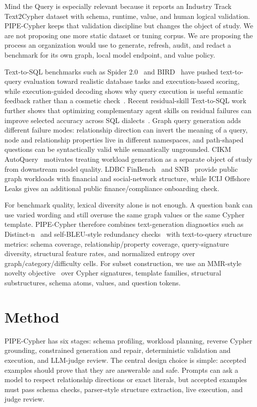 \documentclass[11pt]{article}
\begin{document}
Mind the Query is especially relevant because it reports an Industry Track Text2Cypher dataset with schema, runtime, value, and human logical validation. PIPE-Cypher keeps that validation discipline but changes the object of study. We are not proposing one more static dataset or tuning corpus. We are proposing the process an organization would use to generate, refresh, audit, and redact a benchmark for its own graph, local model endpoint, and value policy.

Text-to-SQL benchmarks such as Spider 2.0~\citep{spider22024} and BIRD~\citep{bird2023} have pushed text-to-query evaluation toward realistic database tasks and execution-based scoring, while execution-guided decoding shows why query execution is useful semantic feedback rather than a cosmetic check~\citep{wang2018executionguidedtexttosql}. Recent residual-skill Text-to-SQL work further shows that optimizing complementary agent skills on residual failures can improve selected accuracy across SQL dialects~\citep{zhu2026residualskilloptimizationtexttosql}. Graph query generation adds different failure modes: relationship direction can invert the meaning of a query, node and relationship properties live in different namespaces, and path-shaped questions can be syntactically valid while semantically ungrounded. CIKM AutoQuery~\citep{autoquery2024} motivates treating workload generation as a separate object of study from downstream model quality. LDBC FinBench~\citep{ldbcfinbench} and SNB~\citep{ldbcsnb} provide public graph workloads with financial and social-network structure, while ICIJ Offshore Leaks gives an additional public finance/compliance onboarding check.

For benchmark quality, lexical diversity alone is not enough. A question bank can use varied wording and still overuse the same graph values or the same Cypher template. PIPE-Cypher therefore combines text-generation diagnostics such as Distinct-n~\citep{li2016diversity} and self-BLEU-style redundancy checks~\citep{zhu2018texygen} with text-to-query structure metrics: schema coverage, relationship/property coverage, query-signature diversity, structural feature rates, and normalized entropy over graph/category/difficulty cells. For subset construction, we use an MMR-style novelty objective~\citep{carbonell1998mmr} over Cypher signatures, template families, structural substructures, schema atoms, values, and question tokens.

\section{Method}
PIPE-Cypher has six stages: schema profiling, workload planning, reverse Cypher grounding, constrained generation and repair, deterministic validation and execution, and LLM-judge review. The central design choice is simple: accepted examples should prove that they are answerable and safe. Prompts can ask a model to respect relationship directions or exact literals, but accepted examples must pass schema checks, parser-style structure extraction, live execution, and judge review.
\end{document}
